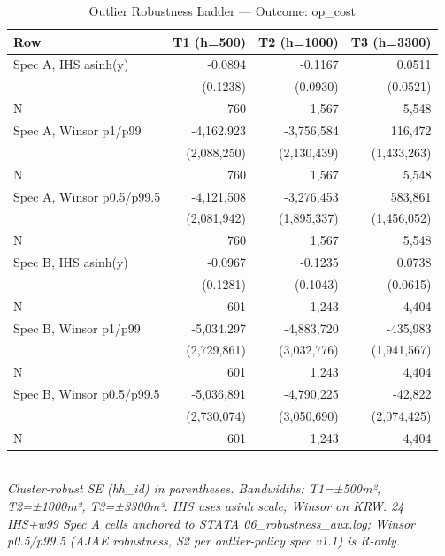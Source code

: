 \begin{table}[t]
\centering
\caption{Outlier Robustness Ladder — Outcome: op_cost}
\label{tab:rob_outlier_op_cost_en}
\begin{tabular}{lrrr}
\toprule
Row & T1 (h=500) & T2 (h=1000) & T3 (h=3300) \\
\midrule
Spec A, IHS asinh(y) & -0.0894 & -0.1167 & 0.0511 \\
        & (0.1238) & (0.0930) & (0.0521) \\
N       & 760 & 1,567 & 5,548 \\
Spec A, Winsor p1/p99 & -4,162,923 & -3,756,584 & 116,472 \\
        & (2,088,250) & (2,130,439) & (1,433,263) \\
N       & 760 & 1,567 & 5,548 \\
Spec A, Winsor p0.5/p99.5 & -4,121,508 & -3,276,453 & 583,861 \\
        & (2,081,942) & (1,895,337) & (1,456,052) \\
N       & 760 & 1,567 & 5,548 \\
Spec B, IHS asinh(y) & -0.0967 & -0.1235 & 0.0738 \\
        & (0.1281) & (0.1043) & (0.0615) \\
N       & 601 & 1,243 & 4,404 \\
Spec B, Winsor p1/p99 & -5,034,297 & -4,883,720 & -435,983 \\
        & (2,729,861) & (3,032,776) & (1,941,567) \\
N       & 601 & 1,243 & 4,404 \\
Spec B, Winsor p0.5/p99.5 & -5,036,891 & -4,790,225 & -42,822 \\
        & (2,730,074) & (3,050,690) & (2,074,425) \\
N       & 601 & 1,243 & 4,404 \\
\bottomrule
\end{tabular}
\\
\footnotesize\textit{Cluster-robust SE (hh_id) in parentheses. Bandwidths: T1=±500m², T2=±1000m², T3=±3300m². IHS uses asinh scale; Winsor on KRW. 24 IHS+w99 Spec A cells anchored to STATA 06_robustness_aux.log; Winsor p0.5/p99.5 (AJAE robustness, S2 per outlier-policy spec v1.1) is R-only.}
\end{table}


